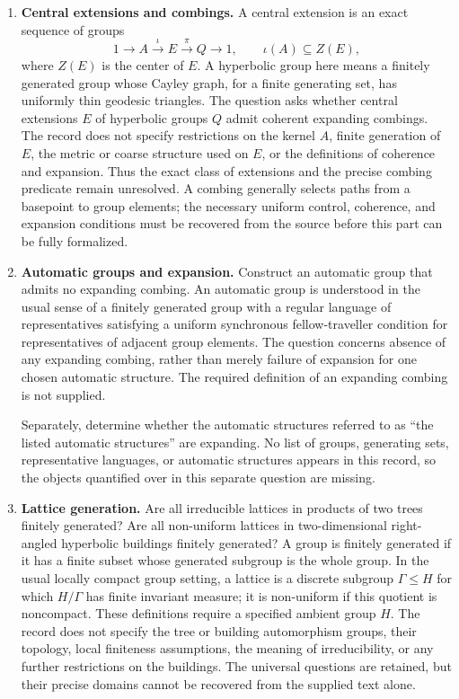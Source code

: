 \documentclass[11pt]{article}
\begin{document}
\begin{enumerate}
\item \textbf{Central extensions and combings.} A central extension is an exact sequence of groups
\[
1\longrightarrow A\xrightarrow{\iota}E\xrightarrow{\pi}Q\longrightarrow 1,
\qquad \iota(A)\subseteq Z(E),
\]
where \(Z(E)\) is the center of \(E\). A hyperbolic group here means a finitely generated group whose Cayley graph, for a finite generating set, has uniformly thin geodesic triangles. The question asks whether central extensions \(E\) of hyperbolic groups \(Q\) admit coherent expanding combings. The record does not specify restrictions on the kernel \(A\), finite generation of \(E\), the metric or coarse structure used on \(E\), or the definitions of coherence and expansion. Thus the exact class of extensions and the precise combing predicate remain unresolved. A combing generally selects paths from a basepoint to group elements; the necessary uniform control, coherence, and expansion conditions must be recovered from the source before this part can be fully formalized.

\item \textbf{Automatic groups and expansion.} Construct an automatic group that admits no expanding combing. An automatic group is understood in the usual sense of a finitely generated group with a regular language of representatives satisfying a uniform synchronous fellow-traveller condition for representatives of adjacent group elements. The question concerns absence of any expanding combing, rather than merely failure of expansion for one chosen automatic structure. The required definition of an expanding combing is not supplied.

Separately, determine whether the automatic structures referred to as ``the listed automatic structures'' are expanding. No list of groups, generating sets, representative languages, or automatic structures appears in this record, so the objects quantified over in this separate question are missing.

\item \textbf{Lattice generation.} Are all irreducible lattices in products of two trees finitely generated? Are all non-uniform lattices in two-dimensional right-angled hyperbolic buildings finitely generated? A group is finitely generated if it has a finite subset whose generated subgroup is the whole group. In the usual locally compact group setting, a lattice is a discrete subgroup \(\Gamma\leq H\) for which \(H/\Gamma\) has finite invariant measure; it is non-uniform if this quotient is noncompact. These definitions require a specified ambient group \(H\). The record does not specify the tree or building automorphism groups, their topology, local finiteness assumptions, the meaning of irreducibility, or any further restrictions on the buildings. The universal questions are retained, but their precise domains cannot be recovered from the supplied text alone.
\end{enumerate}
\end{document}
